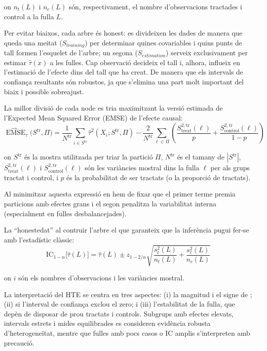 \documentclass[../main.tex]{subfiles}
\begin{document}
    on $n_t(L)$ i $n_c(L)$ són, respectivament, el nombre d’observacions tractades i control a la fulla $L$. \par
    Per evitar biaixos, cada arbre és honest: es divideixen les dades de manera que queda una meitat ($S_{training}$) per determinar quines covariables i quins punts de tall formen l’esquelet de l’arbre; un segona ($S_{estimation}$) serveix exclusivament per estimar $\hat{\tau}(x)$ a les fulles. Cap observació decideix el tall i, alhora, influeix en l’estimació de l’efecte dins del tall que ha creat. De manera que els intervals de confiança resultants són robustos, ja que s'elimina una part molt important del biaix i possible sobreajust.\par
    La millor divisió de cada node es tria maximitzant la versió estimada de l’Expected Mean Squared Error (EMSE) de l’efecte causal:
    \begin{equation}
        \widehat{\operatorname{EMSE}}_{\tau}\bigl(S^{\mathrm{tr}},\Pi\bigr)=
        \frac{1}{N^{\mathrm{tr}}}\sum_{i\in S^{\mathrm{tr}}}\hat{\tau}^{2}(X_i;S^{\mathrm{tr}},\Pi)
        -
        \frac{2}{N^{\mathrm{tr}}}\sum_{\ell\in\Pi}
        \left(
        \frac{S_{\text{treat}}^{2,\mathrm{tr}}(\ell)}{p}+
        \frac{S_{\text{control}}^{2,\mathrm{tr}}(\ell)}{1-p}
        \right)
    \end{equation}    

    on $S^{\mathrm{tr}}$ és la mostra utilitzada per triar la partició $\Pi$, $N^{\mathrm{tr}}$ és el tamany de $|S^{\mathrm{tr}}|$, $S_{\text{treat}}^{2,\mathrm{tr}}(\ell)$ i $S_{\text{control}}^{2,\mathrm{tr}}(\ell)$ són les variàncies mostral dins la fulla $\ell$ per als grups tractat i control, i $p$ és la probabilitat de ser tractats (o la proporció de tractats).\par
    Al minimitzar aquesta expressió en hem de fixar que el primer terme premia particions amb efectes grans i el segon penalitza la variabilitat interna (especialment en fulles desbalancejades).\par 
    La “honestedat” al contruir l'arbre el que garanteix que la inferència pugui fer‐se amb l’estadístic clàssic:
    \begin{equation}
        \text{IC}_{1-\alpha}\!\bigl[\hat{\tau}(L)\bigr] = \hat{\tau}(L) \pm z_{1-2/\alpha} \sqrt{\frac{s_{t}^{2}(L)}{n_{t}(L)} + \frac{s_{c}^{2}(L)}{n_{c}(L)}}
    \end{equation}

    on $i$ són els nombres d’observacions i les variàncies mostral.\par
    La interpretació del HTE se centra en tres aspectes: (i) la magnitud i el signe de ; (ii) si l’interval de confiança exclou el zero; i (iii) l’estabilitat de la fulla, que depèn de disposar de prou tractats i controls. Subgrups amb efectes elevats, intervals estrets i mides equilibrades es consideren evidència robusta d’heterogeneïtat, mentre que fulles amb pocs casos o IC amplis s’interpreten amb precaució.\par
\end{document}
